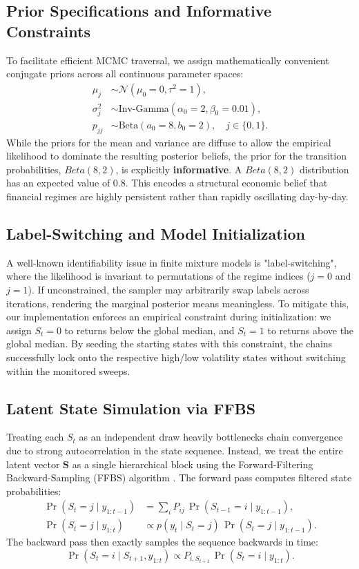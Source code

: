 \documentclass[12pt, a4paper]{article}
\begin{document}
\subsection{Prior Specifications and Informative Constraints}
To facilitate efficient MCMC traversal, we assign mathematically convenient conjugate priors across all continuous parameter spaces:
\begin{align}
  \mu_j &\sim \mathcal{N}(\mu_0=0, \tau^2=1),\label{eq:prior-mu}\\
  \sigma_j^2 &\sim \text{Inv-Gamma}(\alpha_0=2, \beta_0=0.01),\label{eq:prior-sig}\\
  p_{jj} &\sim \text{Beta}(a_0=8, b_0=2),\quad j \in \{0,1\}.\label{eq:prior-p}
\end{align}
While the priors for the mean and variance are diffuse to allow the empirical likelihood to dominate the resulting posterior beliefs, the prior for the transition probabilities, $Beta(8,2)$, is explicitly \textbf{informative}. A $Beta(8,2)$ distribution has an expected value of $0.8$. This encodes a structural economic belief that financial regimes are highly persistent rather than rapidly oscillating day-by-day.

\subsection{Label-Switching and Model Initialization}
A well-known identifiability issue in finite mixture models is "label-switching", where the likelihood is invariant to permutations of the regime indices ($j=0$ and $j=1$). If unconstrained, the sampler may arbitrarily swap labels across iterations, rendering the marginal posterior means meaningless. To mitigate this, our implementation enforces an empirical constraint during initialization: we assign $S_t=0$ to returns below the global median, and $S_t=1$ to returns above the global median. By seeding the starting states with this constraint, the chains successfully lock onto the respective high/low volatility states without switching within the monitored sweeps.

\subsection{Latent State Simulation via FFBS}
Treating each $S_t$ as an independent draw heavily bottlenecks chain convergence due to strong autocorrelation in the state sequence. Instead, we treat the entire latent vector $\mathbf{S}$ as a single hierarchical block using the Forward-Filtering Backward-Sampling (FFBS) algorithm \citep{carter1994, chib1996}. The forward pass computes filtered state probabilities:
\begin{align*}
  \Pr(S_t=j \mid y_{1:t-1}) &= \sum_i P_{ij}\,\Pr(S_{t-1}=i \mid y_{1:t-1}),\\
  \Pr(S_t=j \mid y_{1:t}) &\propto p(y_t \mid S_t=j)\,\Pr(S_t=j \mid y_{1:t-1}).
\end{align*}
The backward pass then exactly samples the sequence backwards in time:
\[
  \Pr(S_t=i \mid S_{t+1}, y_{1:t}) \propto P_{i,S_{t+1}}\,\Pr(S_t=i \mid y_{1:t}).
\]
\end{document}
